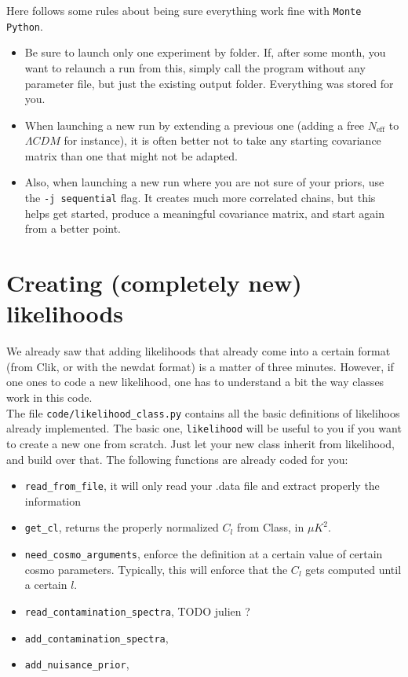 \documentclass[10pt]{article}
\newcommand{\MP}{\texttt{Monte Python}}
\begin{document}
  Here follows some rules about being sure everything work fine with \MP.
\begin{itemize}
  \item Be sure to launch only one experiment by folder. If, after some month,
    you want to relaunch a run from this, simply call the program without any
    parameter file, but just the existing output folder. Everything was stored for you.
  \item When launching a new run by extending a previous one (adding a free
    $N_{\textrm{eff}}$ to $\Lambda CDM$ for instance), it is often better not to
    take any starting covariance matrix than one that might not be adapted.
  \item Also, when launching a new run where you are not sure of your priors,
    use the \verb?-j sequential? flag. It creates much more correlated chains,
    but this helps get started, produce a meaningful covariance matrix, and
    start again from a better point.
\end{itemize}
\newpage
\section{Creating (completely new) likelihoods}

  We already saw that adding likelihoods that already come into a certain format
  (from Clik, or with the newdat format) is a matter of three minutes. However,
  if one ones to code a new likelihood, one has to understand a bit the way
  classes work in this code.\\

  The file \verb?code/likelihood_class.py? contains all the basic definitions
  of likelihoos already implemented. The basic one, \verb?likelihood? will be
  useful to you if you want to create a new one from scratch. Just let your new
  class inherit from likelihood, and build over that. The following functions are already coded for you:\\

  \begin{itemize}
    \item \verb?read_from_file?, it will only read your .data file and extract
      properly the information
    \item \verb?get_cl?, returns the properly normalized $C_l$ from Class, in $\mu K^2$.
    \item \verb?need_cosmo_arguments?, enforce the definition at a certain
      value of certain cosmo parameters. Typically, this will enforce that the
      $C_l$ gets computed until a certain $l$.
    \item \verb?read_contamination_spectra?, TODO julien ?
    \item \verb?add_contamination_spectra?,
    \item \verb?add_nuisance_prior?,
  \end{itemize}
\end{document}
